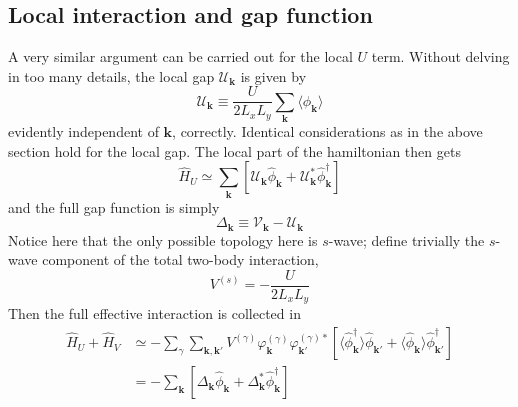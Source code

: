 \subsection{Local interaction and gap function}

A very similar argument can be carried out for the local $U$ term. Without delving in too many details, the local gap $\mathcal{U}_\mathbf{k}$ is given by
\begin{equation}\label{eq:sgap-function-definition}
	\mathcal{U}_\mathbf{k} \equiv \frac{U}{2 L_x L_y} \sum_{\mathbf{k}} \langle 
	\hat \phi_\mathbf{k}
	\rangle
\end{equation}
evidently independent of $\mathbf{k}$, correctly. Identical considerations as in the above section hold for the local gap. The local part of the hamiltonian then gets
\begin{equation}\label{eq:extended-hubbard-local-interaction-mean-field-reciprocal}
	\hat H_U \simeq \sum_\mathbf{k} \left[
	\mathcal{U}_\mathbf{k} \hat \phi_\mathbf{k} + \mathcal{U}_\mathbf{k}^* \hat \phi_\mathbf{k}^\dagger
	\right]	
\end{equation}
and the full gap function is simply
\begin{equation}\label{eq:gap-function-definition}
	\Delta_\mathbf{k} \equiv \mathcal{V}_\mathbf{k} - \mathcal{U}_\mathbf{k}
\end{equation}
Notice here that the only possible topology here is $s$-wave; define trivially the $s$-wave component of the total two-body interaction,
\[
V^{(s)} = - \frac{U}{2L_xL_y}
\]
Then the full effective interaction is collected in
\[
\begin{aligned}
	\hat H_U +\hat H_V &\simeq - \sum_\gamma \sum_{\mathbf{k}, \mathbf{k}'}
	V^{(\gamma)} \varphi_\mathbf{k}^{(\gamma)} \varphi_{\mathbf{k}'}^{(\gamma)*} \left[
		\langle 
			\hat \phi_\mathbf{k}^\dagger
		\rangle \hat \phi_{\mathbf{k}'} + 	\langle 
			\hat \phi_\mathbf{k}
		\rangle \hat \phi_{\mathbf{k}'}^\dagger
	\right]	\\
	&= - \sum_\mathbf{k} \left[
	\Delta_\mathbf{k} \hat \phi_\mathbf{k} + \Delta_\mathbf{k}^* \hat \phi_\mathbf{k}^\dagger
	\right]	
\end{aligned}
\]

